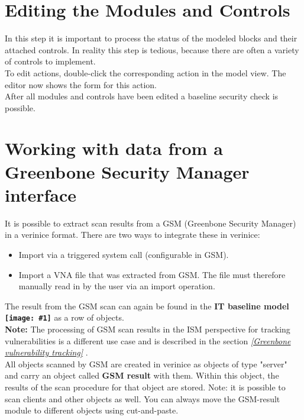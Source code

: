 \documentclass[a4paper,10pt]{book}
\newcommand{\icon}[1]{\texttt{[image: \#1]}}
\begin{document}
\section{Editing the Modules and Controls}
In this step it is important to process the status of the modeled blocks and their attached controls. In reality this step is tedious, because there are
often a variety of controls to implement.
\newline\\
To edit actions, double-click the corresponding action in the model view. The editor now shows the form for this action.
\newline\\
After all modules and controls have been edited a baseline security check is possible.

\section{Working with data from a Greenbone Security Manager interface} \label{sec:greenbone-sec-manager}
It is possible to extract scan results from a GSM (Greenbone Security Manager) in a verinice format.
There are two ways to integrate these in verinice:
 \begin{itemize}
   \item Import via a triggered system call (configurable in GSM).
   \item Import a VNA file that was extracted from GSM. The file must therefore manually read in by the user via an import operation.
 \end{itemize}
 The result from the GSM scan can again be found in the \textbf{IT baseline model \icon{Icon/GS_Modell.png}} as a row of objects.
 \newline\\
 \textbf{Note:} The processing of GSM scan results in the ISM
 perspective for tracking vulnerabilities is a different use case and is described in the section {\em \ref{Greenbone vulnerability tracking} \newline {}}.
 \newline\\
All objects scanned by GSM are created in verinice as objects of type
"server" and carry an object called \textbf{GSM result} with them.
Within this object, the results of the scan procedure for that object are stored.
Note: it is possible to scan clients and other objects as well. You can
always move the GSM-result module to different objects using cut-and-paste.
\end{document}
